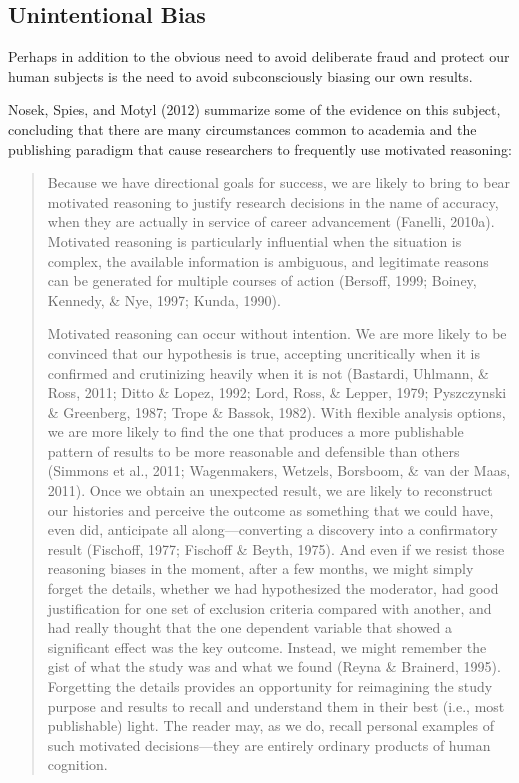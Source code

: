 \documentclass[12pt] {article}
\begin{document}
\subsection{Unintentional Bias}\label{unintentional-bias}

Perhaps in addition to the obvious need to avoid deliberate fraud and
protect our human subjects is the need to avoid subconsciously biasing
our own results.

Nosek, Spies, and Motyl (2012) summarize some of the evidence on this
subject, concluding that there are many circumstances common to academia
and the publishing paradigm that cause researchers to frequently use
motivated reasoning:

\begin{quote}
Because we have directional goals for success, we are likely to bring to
bear motivated reasoning to justify research decisions in the name of
accuracy, when they are actually in service of career advancement
(Fanelli, 2010a). Motivated reasoning is particularly influential when
the situation is complex, the available information is ambiguous, and
legitimate reasons can be generated for multiple courses of action
(Bersoff, 1999; Boiney, Kennedy, \& Nye, 1997; Kunda, 1990).

Motivated reasoning can occur without intention. We are more likely to
be convinced that our hypothesis is true, accepting uncritically when it
is confirmed and crutinizing heavily when it is not (Bastardi, Uhlmann,
\& Ross, 2011; Ditto \& Lopez, 1992; Lord, Ross, \& Lepper, 1979;
Pyszczynski \& Greenberg, 1987; Trope \& Bassok, 1982). With flexible
analysis options, we are more likely to find the one that produces a
more publishable pattern of results to be more reasonable and defensible
than others (Simmons et al., 2011; Wagenmakers, Wetzels, Borsboom, \&
van der Maas, 2011). Once we obtain an unexpected result, we are likely
to reconstruct our histories and perceive the outcome as something that
we could have, even did, anticipate all along---converting a discovery
into a confirmatory result (Fischoff, 1977; Fischoff \& Beyth, 1975).
And even if we resist those reasoning biases in the moment, after a few
months, we might simply forget the details, whether we had hypothesized
the moderator, had good justification for one set of exclusion criteria
compared with another, and had really thought that the one dependent
variable that showed a significant effect was the key outcome. Instead,
we might remember the gist of what the study was and what we found
(Reyna \& Brainerd, 1995). Forgetting the details provides an
opportunity for reimagining the study purpose and results to recall and
understand them in their best (i.e., most publishable) light. The reader
may, as we do, recall personal examples of such motivated
decisions---they are entirely ordinary products of human cognition.
\end{quote}
\end{document}
